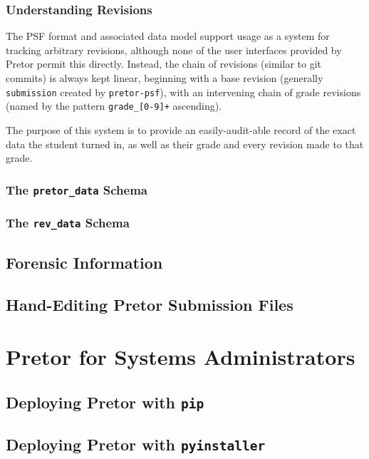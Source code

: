 \documentclass{book}
\begin{document}
\subsection{Understanding Revisions} \label{sec:understanding_revisions}

The PSF format and associated data model support usage as a system for tracking
arbitrary revisions, although none of the user interfaces provided by Pretor
permit this directly. Instead, the chain of revisions (similar to git commits)
is always kept linear, beginning with a base revision (generally
\texttt{submission} created by \texttt{pretor-psf}), with an intervening chain
of grade revisions (named by the pattern \texttt{grade\_[0-9]+} ascending).

The purpose of this system is to provide an easily-audit-able record of the
exact data the student turned in, as well as their grade and every revision
made to that grade.

\subsection{The \texttt{pretor\_data} Schema} \label{sec:pretor_data_schema}

\subsection{The \texttt{rev\_data} Schema} \label{sec:rev_data_schema}

\section{Forensic Information}

\section{Hand-Editing Pretor Submission Files}

\chapter{Pretor for Systems Administrators}

\section{Deploying Pretor with \texttt{pip}}

\section{Deploying Pretor with \texttt{pyinstaller}}
\end{document}
